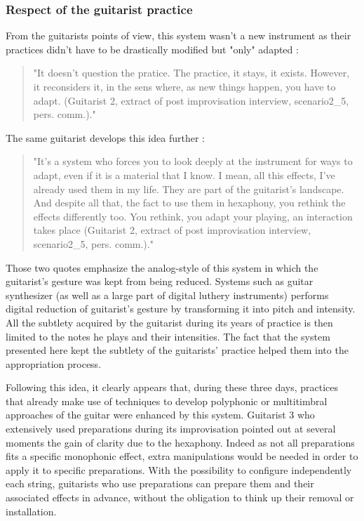 \documentclass{article}
\begin{document}
\subsubsection{Respect of the guitarist practice}
From the guitarists points of view, this system wasn't a new instrument as their practices didn't have to be drastically modified but "only" adapted :
    \begin{quote}
        "It doesn't question the pratice. The practice, it stays, it exists. However, it reconsiders it, in the sens where, as new things happen, you have to adapt. (Guitarist 2, extract of post improvisation interview, scenario2\_5, pers. comm.)."
    \end{quote}
The same guitarist develops this idea further :
    \begin{quote}
        "It's a system who forces you to look deeply at the instrument for ways to adapt, even if it is a material that I know. I mean, all this effects, I've already used them in my life. They are part of the guitarist's landscape. And despite all that, the fact to use them in hexaphony, you rethink the effects differently too. You rethink, you adapt your playing, an interaction takes place (Guitarist 2, extract of post improvisation interview, scenario2\_5, pers. comm.)."
    \end{quote}    

Those two quotes emphasize the analog-style of this system in which the guitarist's gesture was kept from being reduced. Systems such as guitar synthesizer (as well as a large part of digital luthery instruments) performs digital reduction of guitarist's gesture by transforming it into pitch and intensity. All the subtlety acquired by the guitarist during its years of practice is then limited to the notes he plays and their intensities.
The fact that the system presented here kept the subtlety of the guitarists' practice helped them into the appropriation process.

Following this idea, it clearly appears that, during these three days, practices that already make use of techniques to develop polyphonic or multitimbral approaches of the guitar were enhanced by this system. 
Guitarist 3 who extensively used preparations during its improvisation pointed out at several moments the gain of clarity due to the hexaphony. Indeed as not all preparations fits a specific monophonic effect, extra manipulations would be needed in order to apply it to specific preparations. With the possibility to configure independently each string, guitarists who use preparations can prepare them and their associated effects in advance, without the obligation to think up their removal or installation.
\end{document}
